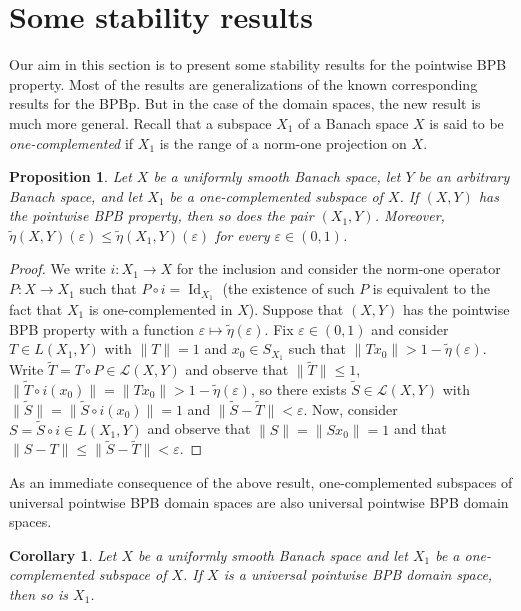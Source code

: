 \documentclass[a4paper,10pt]{amsart}
\theoremstyle{plain}
\newtheorem{corollary}[theorem]{Corollary}
\newtheorem{proposition}[theorem]{Proposition}
\theoremstyle{definition}
\DeclareMathOperator{\Id}{\mathrm{Id}}
\newcommand{\eps}{\varepsilon}
\renewcommand{\leq}{\leqslant}
\begin{document}
\section{Some stability results}\label{sec:stability}

Our aim in this section is to present some stability results for the pointwise BPB property. Most of the results are generalizations of the known corresponding results for the BPBp. But in the case of the domain spaces, the new result is much more general. Recall that a subspace $X_1$ of a Banach space $X$ is said to be \emph{one-complemented} if $X_1$ is the range of a norm-one projection on $X$.

\begin{proposition} \label{prop:abssumdomain:pointwise BPB property}
Let $X$ be a uniformly smooth Banach space, let $Y$ be an arbitrary Banach space, and let $X_1$ be a one-complemented subspace of $X$. If $(X,Y)$ has the pointwise BPB property, then so does the pair $(X_1,Y)$. Moreover, $\tilde\eta(X,Y)(\eps)\leq \tilde\eta(X_1,Y)(\eps)$ for every $\eps\in (0,1)$.
\end{proposition}

\begin{proof}
We write $i:X_1\longrightarrow X$ for the inclusion and consider the norm-one operator $P:X\longrightarrow X_1$ such that $P\circ i=\Id_{X_1}$ (the existence of such $P$ is equivalent to the fact that $X_1$ is one-complemented in $X$). Suppose that $(X,Y)$ has the pointwise BPB property with a function $\eps\longmapsto \tilde\eta(\eps)$. Fix $\eps\in (0,1)$ and consider $T\in L(X_1,Y)$ with $\|T\|=1$ and $x_0\in S_{X_1}$ such that $\|Tx_0\|> 1 - \tilde\eta(\eps)$. Write $\widetilde{T}=T\circ P\in \mathcal{L}(X,Y)$ and observe that $\|\widetilde{T}\|\leq 1$, $\|\widetilde{T}\circ i (x_0)\|=\|Tx_0\|>1-\tilde\eta(\eps)$, so there exists $\widetilde{S}\in \mathcal{L}(X,Y)$ with $\|\widetilde{S}\|=\|\widetilde{S}\circ i(x_0)\|=1$ and $\|\widetilde{S}-\widetilde{T}\|<\eps$. Now, consider $S=\widetilde{S}\circ i\in L(X_1,Y)$ and observe that $\|S\|=\|Sx_0\|=1$ and that $\|S-T\|\leq \|\widetilde{S}-\widetilde{T}\|<\eps$.
\end{proof}

As an immediate consequence of the above result, one-complemented subspaces of universal pointwise BPB domain spaces are also universal pointwise BPB domain spaces.

\begin{corollary}\label{corollary-universalpointwise BPB property-one-complemented}
Let $X$ be a uniformly smooth Banach space and let $X_1$ be a one-complemented subspace of $X$. If $X$ is a universal pointwise BPB domain space, then so is $X_1$.
\end{corollary}
\end{document}
